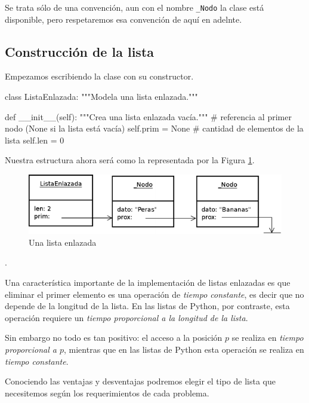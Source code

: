 \begin{observacion}
Se trata sólo de una convención, aun con el nombre \lstinline!_Nodo! la
clase está disponible, pero respetaremos esa convención de aquí en adelnte.
\end{observacion}

\subsection{Construcción de la lista}

Empezamos escribiendo la clase con su constructor.

\begin{codigo-python-sn}
class ListaEnlazada:
    """Modela una lista enlazada."""

    def __init__(self):
        """Crea una lista enlazada vacía."""
        # referencia al primer nodo (None si la lista está vacía)
        self.prim = None
        # cantidad de elementos de la lista
        self.len = 0
\end{codigo-python-sn}

Nuestra estructura ahora será como la representada por la Figura
\ref{lista_enlazada}.

\begin{figure}[htb]
\includegraphics{graficos/16_ListaEnlazada}
\caption{Una lista enlazada}
\label{lista_enlazada}
\end{figure}

.

\begin{sabias_que}
Una característica importante de la implementación de listas enlazadas es que
eliminar el primer elemento es una operación de {\it tiempo constante}, es
decir que no depende de la longitud de la lista. En las listas de
Python, por contraste, esta operación requiere un {\it tiempo proporcional a la
longitud de la lista}.

Sin embargo no todo es tan positivo: el acceso a la posición $p$ se realiza
en {\it tiempo proporcional a $p$}, mientras que en las listas de Python esta
operación se realiza en {\it tiempo constante}.

Conociendo las ventajas y desventajas podremos elegir el tipo de lista que
necesitemos según los requerimientos de cada problema.
\end{sabias_que}

